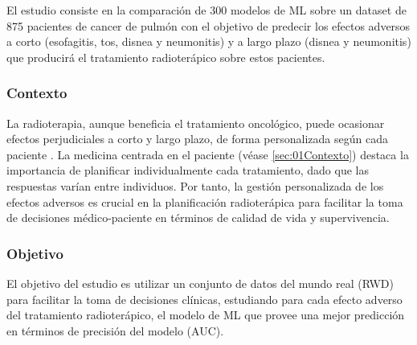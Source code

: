 El estudio consiste en la comparación de 300 modelos de ML sobre un dataset de 875 pacientes de cancer de pulmón con el objetivo de predecir los efectos adversos a corto (esofagitis, tos, disnea y neumonitis) y a largo plazo (disnea y neumonitis) que producirá el tratamiento radioterápico sobre estos pacientes. 

\subsubsection{Contexto}


La radioterapia, aunque beneficia el tratamiento oncológico, puede ocasionar efectos perjudiciales a corto y largo plazo, de forma personalizada según cada paciente \cite{nunez2019comparison, nunez2023benchmarking}. La medicina centrada en el paciente (véase \ref{sec:01Contexto}) destaca la importancia de planificar individualmente cada tratamiento, dado que las respuestas varían entre individuos. Por tanto, la gestión personalizada de los efectos adversos es crucial en la planificación radioterápica para facilitar la toma de decisiones médico-paciente en términos de calidad de vida y supervivencia.

\subsubsection{Objetivo}

El objetivo del estudio es utilizar un conjunto de datos del mundo real (RWD) para facilitar la toma de decisiones clínicas, estudiando para cada efecto adverso del tratamiento radioterápico, el modelo de ML que provee una mejor predicción en términos de precisión del modelo (AUC).

